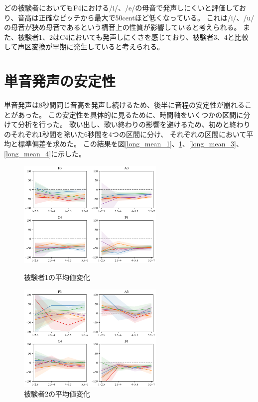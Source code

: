 \documentclass[10.5ptj,a4j,dvipdfmx,uplatex, oneside, openany, report]{jsbook}%
\begin{document}
どの被験者においてもF4における/i/、/e/の母音で発声しにくいと評価しており、音高は正確なピッチから最大で50centほど低くなっている。
これは/i/、/u/の母音が狭め母音であるという構音上の性質が影響していると考えられる。
また、被験者1、2はC4においても発声しにくさを感じており、被験者3、4と比較して声区変換が早期に発生していると考えられる。




\section{単音発声の安定性}
単音発声は8秒間同じ音高を発声し続けるため、後半に音程の安定性が崩れることがあった。
この安定性を具体的に見るために、時間軸をいくつかの区間に分けて分析を行った。
歌い出し、歌い終わりの影響を避けるため、初めと終わりのそれぞれ1秒間を除いた6秒間を4つの区間に分け、
それぞれの区間において平均と標準偏差を求めた。
この結果を図\ref{long_mean_1}、\ref{long_mean_2}、\ref{long_mean_3}、\ref{long_mean_4}に示した。


\begin{figure}[htbp]
    \begin{minipage}{0.5\hsize}
        \begin{center}
            \includegraphics[clip,width=7.0cm]{long_mean_1.png}
          \end{center}
     \caption{被験者1の平均値変化}
     \label{long_mean_1}
    \end{minipage}
    \begin{minipage}{0.5\hsize}
        \begin{center}
            \includegraphics[clip,width=7.0cm]{long_mean_2.png}
          \end{center}
     \caption{被験者2の平均値変化}
     \label{long_mean_2}
    \end{minipage}
\end{figure}
\end{document}
